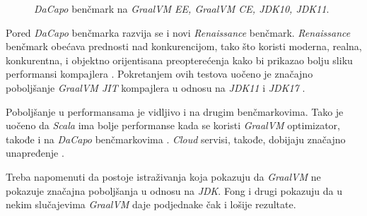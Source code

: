 \documentclass[a4paper]{article}
\begin{document}
\begin{figure}
\begin{center}
\end{center}
    \caption{\emph{DaCapo} benčmark na \emph{GraalVM EE, GraalVM CE, JDK10, JDK11}.}
\label{fig:dacapo}
\end{figure}

Pored \emph{DaCapo} benčmarka razvija se i novi \emph{Renaissance} benčmark. \emph{Renaissance} benčmark obećava prednosti nad konkurencijom, tako što koristi moderna, realna, konkurentna, i objektno orijentisana preopterećenja kako bi prikazao bolju sliku performansi kompajlera \cite{prokopec19}. Pokretanjem ovih testova uočeno je značajno poboljšanje \emph{GraalVM JIT} kompajlera u odnosu na \emph{JDK11} i \emph{JDK17} \cite{renaissance}.

Poboljšanje u performansama je vidljivo i na drugim benčmarkovima. Tako je uočeno da \emph{Scala} ima bolje performanse kada se koristi \emph{GraalVM} optimizator, takođe i na \emph{DaCapo} benčmarkovima \cite{stadler13, dacapo}. \emph{Cloud} servisi, takođe, dobijaju značajno unapređenje \cite{sipek21}. 

Treba napomenuti da postoje istraživanja koja pokazuju da \emph{GraalVM} ne pokazuje značajna poboljšanja u odnosu na \emph{JDK}. Fong i drugi \cite{fong21} pokazuju da u nekim slučajevima \emph{GraalVM} daje podjednake čak i lošije rezultate. 
\end{document}
